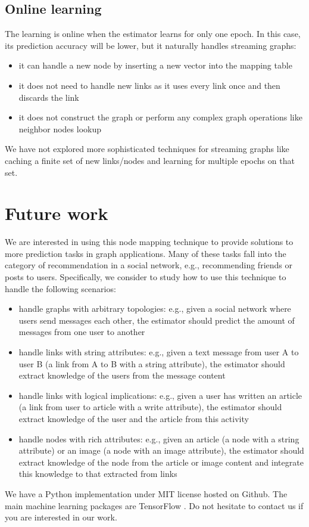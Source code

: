 \documentclass[twocolumn]{article}
\begin{document}
\subsection{Online learning}
The learning is online when the estimator learns for only one epoch. In 
this case, its prediction accuracy will be lower, but it naturally handles 
streaming graphs:
\begin{itemize}
	\item it can handle a new node by inserting a new vector into the mapping 
	table
	\item it does not need to handle new links as it uses every link once and 
	then discards the link
	\item it does not construct the graph or perform any complex graph 
	operations like neighbor nodes lookup
\end{itemize}
We have not explored more sophisticated techniques for streaming graphs like 
caching a finite set of new links/nodes and learning for multiple epochs on 
that set.

\section{Future work}
We are interested in using this node mapping technique to provide solutions to 
more prediction tasks in graph applications. Many of these tasks fall into the 
category of recommendation in a social network, e.g., recommending friends or 
posts to users.
Specifically, we consider to study how to use this technique to handle the 
following scenarios:
\begin{itemize}
	\item handle graphs with arbitrary topologies: e.g., given a social 
	network where users send messages each other, the estimator should 
	predict the amount of messages from one user to another
	\item handle links with string attributes: e.g., given a text message from 
	user A to user B (a link from A to B with a string attribute), the 
	estimator should extract knowledge of the users from the message content
	\item handle links with logical implications: e.g., given a user has 
	written an article (a link from user to article with a write attribute), 
	the estimator should extract knowledge of the user and the article from 
	this activity
	\item handle nodes with rich attributes: e.g., given an article (a node 
	with a string attribute) or an image (a node with an image attribute), the 
	estimator should extract knowledge of the node from the article or image 
	content and integrate this knowledge to that extracted from links
\end{itemize}
We have a Python implementation under MIT license hosted on Github.
The main machine learning packages are TensorFlow \cite{abadi2016tensorflow}.
Do not hesitate to contact us if you are interested in our work.
\end{document}
